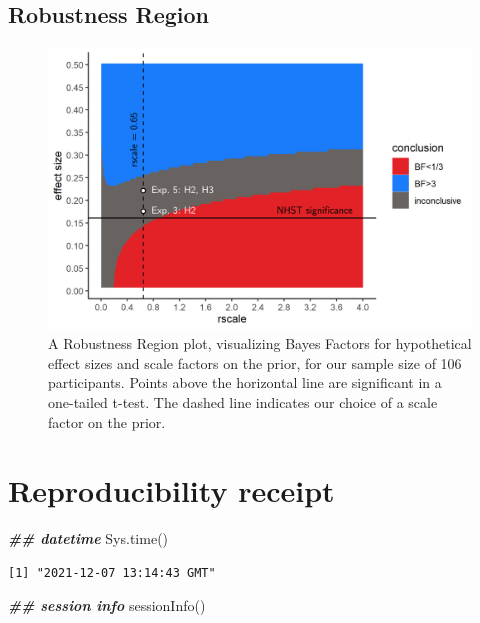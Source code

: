 \documentclass[12pt,twoside]{reedthesis}
\newenvironment{Shaded}{\begin{snugshade}}{\end{snugshade}}
\newcommand{\DocumentationTok}[1]{\textcolor[rgb]{0.56,0.35,0.01}{\textbf{\textit{#1}}}}
\newcommand{\FunctionTok}[1]{\textcolor[rgb]{0.00,0.00,0.00}{#1}}
\newcommand{\NormalTok}[1]{#1}
\begin{document}
\hypertarget{robustness-region}{%
\section{Robustness Region}\label{robustness-region}}
\begin{figure}
\includegraphics[width=1\linewidth]{figure/asymmetry/RR} \caption[Robustness region]{A Robustness Region plot, visualizing Bayes Factors for hypothetical effect sizes and scale factors on the prior, for our sample size of 106 participants. Points above the horizontal line are significant in a one-tailed t-test. The dashed line indicates our choice of a scale factor on the prior.}\label{fig:app5-RR}
\end{figure}
\hypertarget{reproducibility-receipt}{%
\chapter{Reproducibility receipt}\label{reproducibility-receipt}}
\begin{Shaded}
\begin{Highlighting}[]
\DocumentationTok{\#\# datetime}
\FunctionTok{Sys.time}\NormalTok{()}
\end{Highlighting}
\end{Shaded}
\begin{verbatim}
[1] "2021-12-07 13:14:43 GMT"
\end{verbatim}
\begin{Shaded}
\begin{Highlighting}[]
\DocumentationTok{\#\# session info}
\FunctionTok{sessionInfo}\NormalTok{()}
\end{Highlighting}
\end{Shaded}
\end{document}
